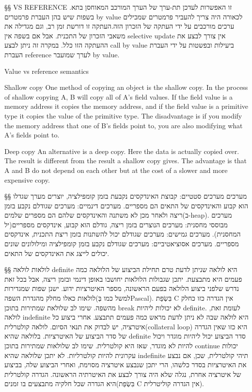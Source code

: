         §§ VS REFERENCE
        זו האפשרות לעדכן תת-ערך של הערך המורכב המאוחסן בתא.
        בשפות שיש בהן העברת פרמטרים by value לכאורה היה צריך להעביר פרמטרים שמכילים ערכים מורכבים על ידי העתקה של הזכרון הזה.העתקה זו דורשת זמן רב, וגם מגדילה את משאבי הזכרון של התכנית.
        אבל אם בשפה אין selective update אין צורך לבצע את ההעתקה הזו כלל. במקרה זה ניתן לבצע call by value ביעילות ובפשטות על ידי העברת העברת reference לערך שמועבר by value.

        Value vs reference semantics

        Shallow copy
        One method of copying an object is the shallow copy. In the process of shallow copying A, B will copy all of A's field values. If the field value is a memory address it copies the memory address, and if the field value is a primitive type it copies the value of the primitive type.
        The disadvantage is if you modify the memory address that one of B's fields point to, you are also modifying what A's fields point to.

        Deep copy
        An alternative is a deep copy. Here the data is actually copied over. The result is different from the result a shallow copy gives. The advantage is that A and B do not depend on each other but at the cost of a slower and more expensive copy.

        §§ מערכים
        מערכים סטטיים:
        קבוצת האינדקסים נקבעת בזמן קומפילציה, יוצרים מערך שגדלו הוא קבוע והאינדקסים של התאים הם מספריים.
        מערכים דינמיים:
        מערכים שגודלם נקבע בזמן ריצה ולאחר מכן לא משתנה והאינדקסים שלהם הם מספרים שלמים(ב-heap).
        מערכים מבוססי מחסנית:
        מערכים הנוצרים בזמן ריצה, גודלם הוא קבוע, אינדקסים מספריים(יל המחסנית).
        מערכים גמישים:
        מערכים שגודלם יכול להשתנות בזמן ריצת התכנית, אינדקסים מספריים.
        מערכים אסוציאטיביים:
        מערכים שגודלם נקבע בזמן קומפילציה ומילולונים שונים יכולים לייצג את האינדקסים של התאים.

        §§ לולאות
        לולאה definite היא לולאה שניתן לדעת טרם תחילת הביצוע של הלולאה כמה פעמים היא מתבצעת. יתכן שגבולות הלולאות יחושבו באופן דינמי ובזמן ריצה, אבל בכל זאת נדרש שלפני ביצוע הלולאה בפעם הראשונה, מספר האיטרציות ידוע. ישנן שפות שמגדירות לולאות כאלו מחלק מהגדרת השפה(למשל כמו בְּPascal).
        בִּשְׂפַת C אין הגדרה כזו כחלק מהשפה. שימו לב שלולאת שמתירות בתוכן break לא יכולות ליהיות definite.
        לעומת זאת, לולאה indefinite היא לולאה שבה לא ניתן לדעת מראש כמה פעמים תתבצע. אחרי ביצוע כל איטרציה, יש לבדוק את תנאי הסיום.
        לולאה קולטרלית(collateral loop) היא כזו שאין הגדרה של סדר הביצוע של האיטרציות. בלולאה שהיא definite סדר הביצוע יכול ליהיות מוגדר ויכול להיות לא מוגדר, שאז היא קולטרלית. שימו לב שלולאות שמתירות בתוכן continue יכולות עקרונית להיות קולטרליות. לא יתכן שלולאה שהיא indefinite תיהי קולטרלית, שכן, אם נבצע את האיטרציות בסדר כלשהו, הרי יתכן שנבצע איטרציה מסוימת, ואחרי הביצוע שלה, בביצוע של איטרציה אחרת, נגלה שלא היה צורך לבצע את האיטרתיה הראשונה.
        הגדרה קולטרלית היא הגדרה שכל חלקיה מתבצעים בו זמנים(בִּשְׂפַת C אין הגדרה קוליטרלית).

